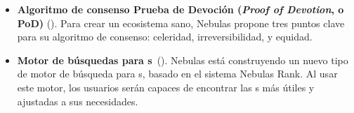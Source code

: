 {\begin{itemize}
  \item \textbf{Algoritmo de consenso Prueba de Devoción (\textit{Proof of Devotion}, o PoD)} (). Para crear un ecosistema sano, Nebulas propone tres puntos clave para su algoritmo de consenso: celeridad, irreversibilidad, y equidad.

  \item \textbf{Motor de búsquedas para {\dapp}s}~(). Nebulas está construyendo un nuevo tipo de motor de búsqueda para {\dapp}s, basado en el sistema Nebulas Rank. Al usar este motor, los usuarios serán capaces de encontrar las {\dapp}s más útiles y ajustadas a sus necesidades.

\end{itemize}
}